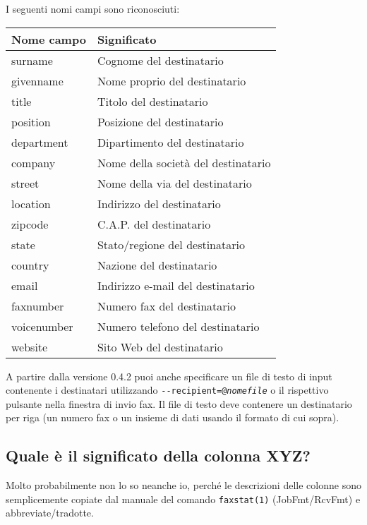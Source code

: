 \documentclass[a4paper,10pt]{scrartcl}
\begin{document}
I seguenti nomi campi sono riconosciuti:
\begin{center}
\begin{tabular}{|l|p{}|}
\hline
\bfseries Nome campo & \bfseries Significato \\
\hline\hline
\ttfamily surname & Cognome del destinatario\\\hline
\ttfamily givenname & Nome proprio del destinatario \\\hline
\ttfamily title & Titolo del destinatario \\\hline
\ttfamily position & Posizione del destinatario \\\hline
\ttfamily department & Dipartimento del destinatario\\\hline
\ttfamily company & Nome della società del destinatario\\\hline
\ttfamily street & Nome della via del destinatario \\\hline
\ttfamily location & Indirizzo del destinatario\\\hline
\ttfamily zipcode & C.A.P. del destinatario \\\hline
\ttfamily state & Stato/regione del destinatario\\\hline
\ttfamily country & Nazione del destinatario\\\hline
\ttfamily email & Indirizzo e-mail del destinatario\\\hline
\ttfamily faxnumber & Numero fax del destinatario \\\hline
\ttfamily voicenumber & Numero telefono del destinatario \\\hline
\ttfamily website & Sito Web del destinatario\\\hline
\end{tabular}
\end{center}

A partire dalla versione 0.4.2 puoi anche specificare un file di testo di input contenente i destinatari utilizzando \texttt{-{-}recipient=@\textit{nomefile}} o il rispettivo pulsante nella finestra di invio fax.
Il file di testo deve contenere un destinatario per riga (un numero fax o un insieme di dati usando il formato di cui sopra).

\subsection{Quale è il significato della colonna XYZ?}

Molto probabilmente non lo so neanche io, perché le descrizioni delle colonne
sono semplicemente copiate dal manuale del comando \verb.faxstat(1). (JobFmt/RcvFmt) e
abbreviate/tradotte.
\end{document}

